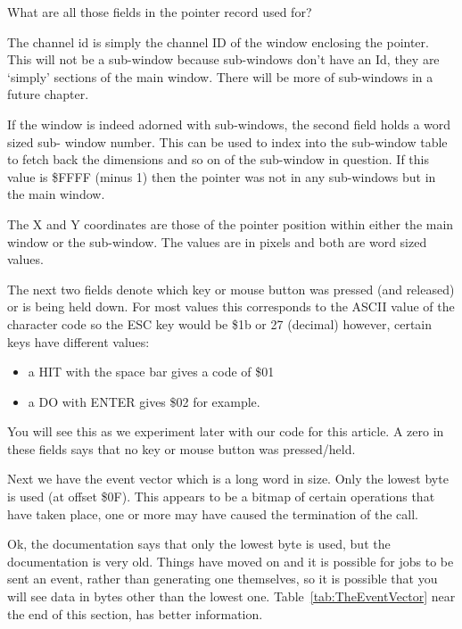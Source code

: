 What are all those fields in the pointer record used for?

The channel id is simply the channel ID of the window enclosing the pointer. This will not
be a sub-{}window because sub-{}windows don't have an Id, they are `simply' sections of the
main window. There will be more of sub-{}windows in a future chapter.

If the window is indeed adorned with sub-{}windows, the second field holds a word sized sub-{}
window number. This can be used to index into the sub-{}window table to fetch back the
dimensions and so on of the sub-{}window in question. If this value is \$FFFF (minus 1) then
the pointer was not in any sub-{}windows but in the main window.

The X and Y coordinates are those of the pointer position within either the main window
or the sub-{}window. The values are in pixels and both are word sized values.

The next two fields denote which key or mouse button was pressed (and released) or is
being held down. For most values this corresponds to the ASCII value of the character code
so the ESC key would be \$1b or 27 (decimal) however, certain keys have different
values:

\begin{itemize}[itemsep=0pt]

\item{}a HIT with the space bar gives a code of \$01

\item{}a DO with ENTER gives \$02 for example.

\end{itemize}

You will see this as we experiment later with our code for this article. A zero in these
fields says that no key or mouse button was pressed/held.

Next we have the event vector which is a long word in size. Only the lowest byte is used
(at offset \$0F). This appears to be a bitmap of certain operations that have taken place,
 one or more may have caused the termination of the  call.

Ok, the documentation says that only the lowest byte is used, but the documentation is 
very old. Things have moved on and it is possible for jobs to be sent an event, rather
than generating one themselves, so it is possible that you will see data in bytes other
than the lowest one. Table~\ref{tab:TheEventVector} near the end of this section,
has better information.

